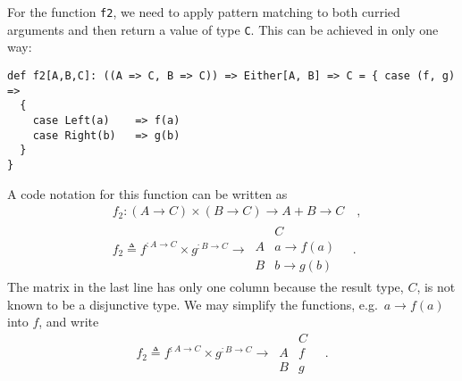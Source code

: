 For the function \lstinline!f2!, we need to apply pattern matching
to both curried arguments and then return a value of type \lstinline!C!.
This can be achieved in only one way:
\begin{lstlisting}
def f2[A,B,C]: ((A => C, B => C)) => Either[A, B] => C = { case (f, g) =>
  {
    case Left(a)    => f(a)
    case Right(b)   => g(b)
  }
}
\end{lstlisting}
A code notation for this function can be written as
\begin{align*}
 & f_{2}:\left(A\rightarrow C\right)\times\left(B\rightarrow C\right)\rightarrow A+B\rightarrow C\quad,\\
 & f_{2}\triangleq f^{:A\rightarrow C}\times g^{:B\rightarrow C}\rightarrow\,\begin{array}{|c||c|}
 & C\\
\hline A & a\rightarrow f(a)\\
B & b\rightarrow g(b)
\end{array}\quad.
\end{align*}
The matrix in the last line has only one column because the result
type, $C$, is not known to be a disjunctive type. We may simplify
the functions, e.g.~$a\rightarrow f(a)$ into $f$, and write
\[
f_{2}\triangleq f^{:A\rightarrow C}\times g^{:B\rightarrow C}\rightarrow\,\begin{array}{|c||c|}
 & C\\
\hline A & f\\
B & g
\end{array}\quad.
\]

